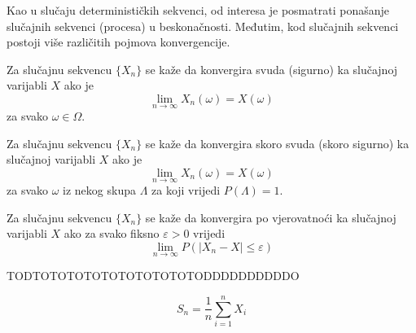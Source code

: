 Kao u slučaju determinističkih sekvenci, od interesa je posmatrati ponašanje
slučajnih sekvenci (procesa) u beskonačnosti. Međutim, kod slučajnih sekvenci
postoji više različitih pojmova konvergencije.

\begin{definition}
  Za slučajnu sekvencu $\{X_n\}$ se kaže da konvergira svuda (sigurno) ka
  slučajnoj varijabli $X$ ako je
  \begin{equation}
    \lim_{n\to\infty} X_n(\omega) = X(\omega)
  \end{equation}
  za svako $\omega \in \Omega$.
\end{definition}

\begin{definition}
  Za slučajnu sekvencu $\{X_n\}$ se kaže da konvergira skoro svuda (skoro
  sigurno) ka slučajnoj varijabli $X$ ako je
  \begin{equation}
    \lim_{n\to\infty} X_n(\omega) = X(\omega)
  \end{equation}
  za svako $\omega$ iz nekog skupa $\Lambda$ za koji vrijedi $P(\Lambda)=1$.
\end{definition}

\begin{definition}
  Za slučajnu sekvencu $\{X_n\}$ se kaže da konvergira po vjerovatnoći ka
  slučajnoj varijabli $X$ ako za
  svako fiksno $\varepsilon > 0$ vrijedi
  \begin{equation}
    \lim_{n\to\infty} P\left(|X_n - X| \le \varepsilon\right)
  \end{equation}
\end{definition}

TODTOTOTOTOTOTOTOTOTOTODDDDDDDDDDO

\begin{equation} \label{eq:sample-mean}
  S_n = \frac{1}{n} \sum_{i=1}^{n} X_i
\end{equation}



